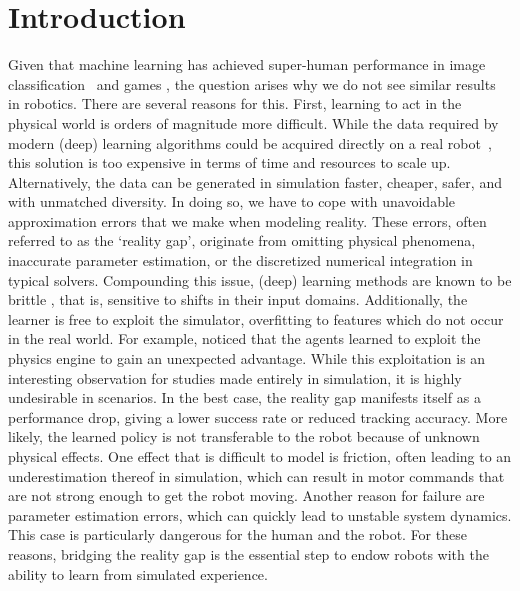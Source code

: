 \documentclass[utf8]{frontiersSCNS} %
\begin{document}
\section{Introduction}
Given that machine learning has achieved super-human performance in image classification~\citep{Ciresan_Schmidhuber_12,Krizhevsky_Hinton_12} and games \citep{Mnih_Hassabis_15,Silver_Hassabis_16}, the question arises why we do not see similar results in robotics.
%
There are several reasons for this.
First, learning to act in the physical world is orders of magnitude more difficult.
While the data required by modern (deep) learning algorithms could be acquired directly on a real robot~\citep{Levine_Quillen_16}, this solution is too expensive in terms of time and resources to scale up.
%
Alternatively, the data can be generated in simulation faster, cheaper, safer, and with unmatched diversity.
In doing so, we have to cope with unavoidable approximation errors that we make when modeling reality.
These errors, often referred to as the \enquote*{reality gap}, originate from omitting physical phenomena, inaccurate parameter estimation, or the discretized numerical integration in typical solvers.
%
Compounding this issue, \sota (deep) learning methods are known to be brittle \citep{Szegedy_Fergus_13,Goodfellow_Szegedy_14,Huang_Abbeel_17}, that is, sensitive to shifts in their input domains.
Additionally, the learner is free to exploit the simulator, overfitting to features which do not occur in the real world.
For example, \citet{Baker_Mordatch_20} noticed that the agents learned to exploit the physics engine to gain an unexpected advantage.
While this exploitation is an interesting observation for studies made entirely in simulation, it is highly undesirable in \simtoreal scenarios.
In the best case, the reality gap manifests itself as a performance drop, giving a lower success rate or reduced tracking accuracy.
More likely, the learned policy is not transferable to the robot because of unknown physical effects.
One effect that is difficult to model is friction, often leading to an underestimation thereof in simulation, which can result in motor commands that are not strong enough to get the robot moving.
Another reason for failure are parameter estimation errors, which can quickly lead to unstable system dynamics.
This case is particularly dangerous for the human and the robot.
For these reasons, bridging the reality gap is the essential step to endow robots with the ability to learn from simulated experience.
\end{document}
